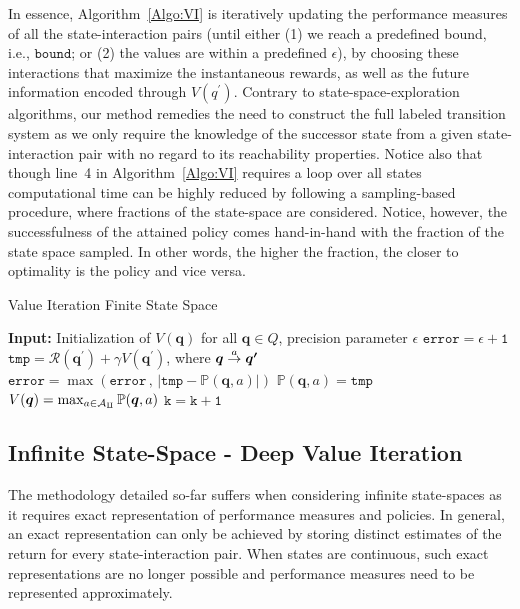 In essence, Algorithm~\ref{Algo:VI} is iteratively updating the performance measures of all the state-interaction pairs (until either (1) we reach a predefined bound, i.e., $\mathtt{bound}$; or (2) the values are within a predefined $\epsilon$),  by choosing these interactions that maximize the instantaneous rewards, as well as the future information encoded through $V(q^{\prime})$. 
Contrary to state-space-exploration algorithms, our method remedies the need to construct the full labeled transition system as we only require the knowledge of the successor state from a given state-interaction pair with no regard to its reachability properties. Notice also that though line~4 in Algorithm~\ref{Algo:VI} requires a loop over all states computational time can be highly reduced by following a sampling-based procedure, where fractions of the state-space are considered. Notice, however, the successfulness of the attained policy comes hand-in-hand with the fraction of the state space sampled. In other words, the higher the fraction, the closer to optimality is the policy and vice versa. 
\vspace*{-0.5cm}
\begin{algorithm}[h]
\caption{Value Iteration Finite State Space}
\label{Algo:VI}
\begin{algorithmic}[1]
\STATE \textbf{Input:} Initialization of $V( \bm{q})$ for all $ \bm{q}\in Q$, precision parameter $\epsilon$
\STATE $\mathtt{error = \epsilon + 1} $
			\STATE $\mathtt{tmp} = \mathcal{R}( \bm{q^{\prime}}) + \gamma V( \bm{q^{\prime}})$, where $ \bm{q} \goesto[a] \bm{q^{\prime}}$
		\STATE $\mathtt{error} =\max(\mathtt{error}\, , \, |\mathtt{tmp} - \mathbb{P}( \bm{q}, a)|)$
			\STATE $\mathbb{P}( \bm{q}, a) = \mathtt{tmp}$
		\ENDFOR
	\STATE $V( \bm{q}) =  \max_{a \in {\cal A_{\bm{q}}}} \mathbb{P}(\bm{q}, a)$
	\ENDFOR
	\STATE $\mathtt{k = k + 1}$
\ENDWHILE
\end{algorithmic}
\end{algorithm}
\vspace*{-0.8cm}

\subsection{Infinite State-Space - Deep Value Iteration}
The methodology detailed so-far suffers when considering infinite state-spaces as it requires exact representation of performance measures and policies. In general, an exact representation can only be achieved by storing distinct estimates of the return for every state-interaction pair. When states are continuous, such exact representations are no longer possible and performance measures need to be represented approximately. 

